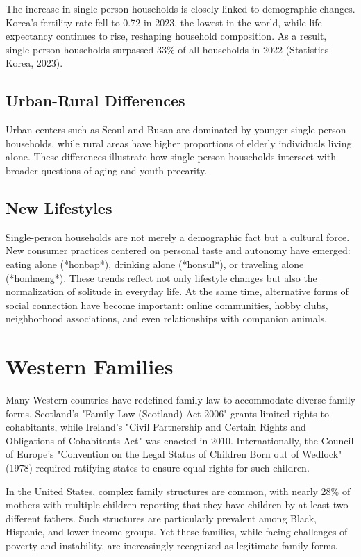 The increase in single-person households is closely linked to demographic changes. Korea’s fertility rate fell to 0.72 in 2023, the lowest in the world, while life expectancy continues to rise, reshaping household composition. As a result, single-person households surpassed 33\% of all households in 2022 (Statistics Korea, 2023).  

\subsection{Urban-Rural Differences}

Urban centers such as Seoul and Busan are dominated by younger single-person households, while rural areas have higher proportions of elderly individuals living alone. These differences illustrate how single-person households intersect with broader questions of aging and youth precarity.  

\subsection{New Lifestyles}

Single-person households are not merely a demographic fact but a cultural force. New consumer practices centered on personal taste and autonomy have emerged: eating alone (*honbap*), drinking alone (*honsul*), or traveling alone (*honhaeng*). These trends reflect not only lifestyle changes but also the normalization of solitude in everyday life. At the same time, alternative forms of social connection have become important: online communities, hobby clubs, neighborhood associations, and even relationships with companion animals.  

\section{Western Families}

Many Western countries have redefined family law to accommodate diverse family forms. Scotland’s "Family Law (Scotland) Act 2006" grants limited rights to cohabitants, while Ireland’s "Civil Partnership and Certain Rights and Obligations of Cohabitants Act" was enacted in 2010. Internationally, the Council of Europe’s "Convention on the Legal Status of Children Born out of Wedlock" (1978) required ratifying states to ensure equal rights for such children.  

In the United States, complex family structures are common, with nearly 28\% of mothers with multiple children reporting that they have children by at least two different fathers. Such structures are particularly prevalent among Black, Hispanic, and lower-income groups. Yet these families, while facing challenges of poverty and instability, are increasingly recognized as legitimate family forms.  

